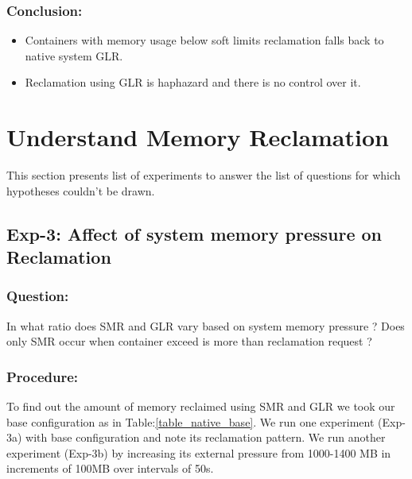       \subsubsection{Conclusion:}
	\begin{itemize}
	  \item Containers with memory usage below soft limits reclamation falls back to native system GLR.
	  \item Reclamation using GLR is haphazard and there is no control over it. 
	\end{itemize}

  
  \section{Understand Memory Reclamation}
  
    This section presents list of experiments to answer the list of questions for which hypotheses couldn't be drawn. 
  
    \subsection{Exp-3: Affect of system memory pressure on Reclamation}
	
	\subsubsection{Question:} 
	   In what ratio does SMR and GLR vary based on system memory pressure ? Does only SMR occur when container exceed is more than 
reclamation request ?
	
	\subsubsection{Procedure:}
	  To find out the amount of memory reclaimed using SMR and GLR we took our base configuration as in Table:\ref{table_native_base}. 
We run one experiment (Exp-3a) with base configuration and note its reclamation pattern. We run another experiment (Exp-3b) by increasing 
its external pressure from 1000-1400 MB in increments of 100MB over intervals of 50s.
	 
